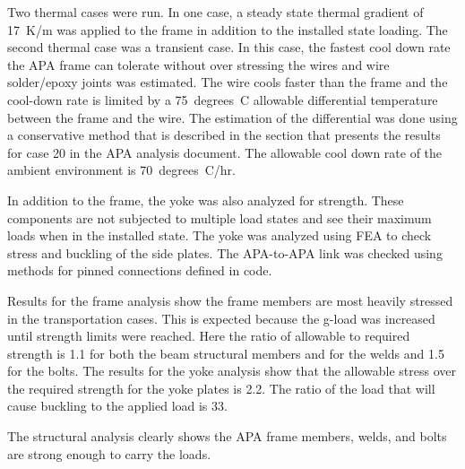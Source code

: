 Two thermal cases were run. In one case, a steady state thermal gradient of \SI{17}{K/m} was applied to the frame in addition to the installed state loading.   The second thermal case was a transient case.  In this case, the fastest cool down rate the APA frame can tolerate without over stressing the wires and wire solder/epoxy joints was estimated.  The wire cools faster than the frame and the cool-down rate is limited by a 75~degrees~C allowable differential temperature between the frame and the wire.  The estimation of the differential was done using a conservative method that is described in the section that presents the results for case 20 in the APA analysis document.  The allowable cool down rate of the ambient environment is 70~degrees~C/hr.

In addition to the frame, the yoke was also analyzed for strength.  These components are not subjected to multiple load states and see their maximum loads when in the installed state.  The yoke was analyzed using FEA to check stress and buckling of the side plates.  The APA-to-APA link was checked using methods for pinned connections defined in code.

Results for the frame analysis show the frame members are most heavily stressed in the transportation cases.  This is expected because the g-load was increased until strength limits were reached.  Here the ratio of allowable to required strength is 1.1 for both the beam structural members and for the welds and 1.5 for the bolts.
The results for the yoke analysis show that the allowable stress over the required strength for the yoke plates is 2.2.  The ratio of the load that will cause buckling to the applied load is 33.

The structural analysis clearly shows the APA frame members, welds, and bolts are strong enough to carry the loads.

